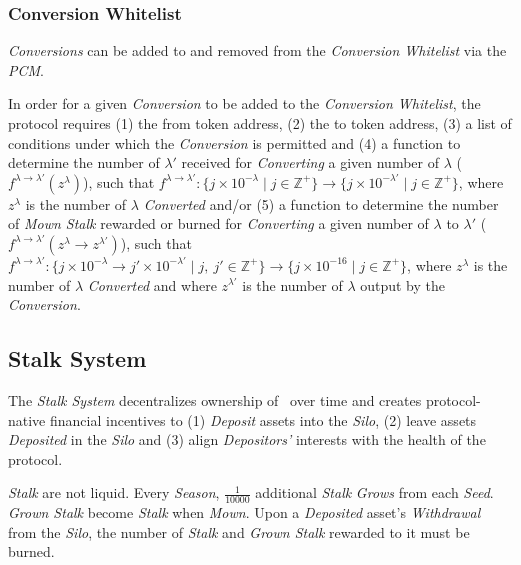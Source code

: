 \documentclass[tikz]{article}
\newcommand{\term}[1]{\textsl{#1}}
\newcommand{\Pinto}{} %
\renewcommand{\Pinto}{\usebox{\cachePinto}}
\begin{document}

\subsubsection{Conversion Whitelist}

\term{Conversions} can be added to and removed from the \term{Conversion Whitelist} via the \term{PCM}.

In order for a given \term{Conversion} to be added to the \term{Conversion Whitelist}, the protocol requires 
(1) the from token address, 
(2) the to token address, 
(3) a list of conditions under which the \term{Conversion} is permitted and 
(4) a function to determine the number of $\lambda'$ received for \term{Converting} a given number of $\lambda$ ($f^{\lambda \rightarrow \lambda'}(z^{\lambda})$), such that $f^{\lambda \rightarrow \lambda'}\colon \{j \times 10^{-\lambda} \mid j \in \mathbb{Z}^{+} \} \rightarrow \{j \times 10^{-\lambda'} \mid j \in \mathbb{Z}^{+} \}$, where $z^{\lambda}$ is the number of $\lambda$ \term{Converted} and/or 
(5) a function to determine the number of \term{Mown Stalk} rewarded or burned for \term{Converting} a given number of $\lambda$ to $\lambda'$ ($f^{\lambda \rightarrow \lambda'}(z^{\lambda} \rightarrow z^{\lambda'})$), such that $f^{\lambda \rightarrow \lambda'}\colon \{j \times 10^{-\lambda} \rightarrow j' \times 10^{-\lambda'} \mid j,\ j' \in \mathbb{Z}^{+} \} \rightarrow \{j \times 10^{-16} \mid j \in \mathbb{Z}^{+} \}$, where $z^{\lambda}$ is the number of $\lambda$ \term{Converted} and where $z^{\lambda'}$ is the number of $\lambda$ output by the \term{Conversion}. 


\vspace*{-1.35mm}
\subsection{Stalk System}
\vspace*{-1.35mm}

The \term{Stalk System} decentralizes ownership of \Pinto\ over time and creates protocol-native financial incentives to (1) \term{Deposit} assets into the \term{Silo}, (2) leave assets \term{Deposited} in the \term{Silo} and (3) align \term{Depositors'} interests with the health of the protocol.

\term{Stalk} are not liquid. Every \term{Season}, $\frac{1}{10000}$ additional \term{Stalk} \term{Grows} from each \term{Seed}. \term{Grown Stalk} become \term{Stalk} when \term{Mown}. Upon a \term{Deposited} asset's \term{Withdrawal} from the \term{Silo}, the number of \term{Stalk} and \term{Grown Stalk} rewarded to it must be burned.
\end{document}
